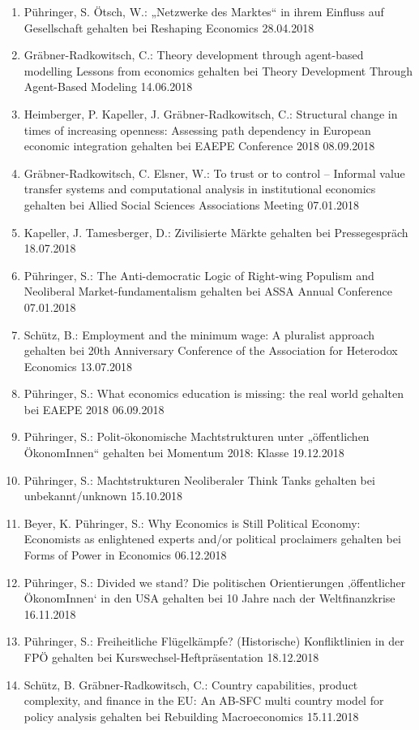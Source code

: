 \begin{enumerate}
	\item Pühringer, S. Ötsch, W.: „Netzwerke des Marktes“ in ihrem Einfluss auf Gesellschaft gehalten bei Reshaping Economics 28.04.2018
	\item Gräbner-Radkowitsch, C.: Theory development through agent-based modelling Lessons from economics gehalten bei Theory Development Through Agent-Based Modeling 14.06.2018
	\item Heimberger, P. Kapeller, J. Gräbner-Radkowitsch, C.: Structural change in times of increasing openness: Assessing path dependency in European economic integration gehalten bei EAEPE Conference 2018 08.09.2018
	\item Gräbner-Radkowitsch, C. Elsner, W.: To trust or to control -- Informal value transfer systems and computational analysis in institutional economics gehalten bei Allied Social Sciences Associations Meeting 07.01.2018
	\item Kapeller, J. Tamesberger, D.: Zivilisierte Märkte gehalten bei Pressegespräch 18.07.2018
	\item Pühringer, S.: The Anti-democratic Logic of Right-wing Populism and Neoliberal Market-fundamentalism gehalten bei ASSA Annual Conference 07.01.2018
	\item Schütz, B.: Employment and the minimum wage: A pluralist approach gehalten bei 20th Anniversary Conference of the Association for Heterodox Economics 13.07.2018
	\item Pühringer, S.: What economics education is missing: the real world gehalten bei EAEPE 2018 06.09.2018
	\item Pühringer, S.: Polit-ökonomische Machtstrukturen unter „öffentlichen ÖkonomInnen“ gehalten bei Momentum 2018: Klasse 19.12.2018
	\item Pühringer, S.: Machtstrukturen Neoliberaler Think Tanks gehalten bei unbekannt/unknown 15.10.2018
	\item Beyer, K. Pühringer, S.: Why Economics is Still Political Economy: Economists as enlightened experts and/or political proclaimers gehalten bei Forms of Power in Economics 06.12.2018
	\item Pühringer, S.: Divided we stand? Die politischen Orientierungen ‚öffentlicher ÖkonomInnen‘ in den USA gehalten bei 10 Jahre nach der Weltfinanzkrise 16.11.2018
	\item Pühringer, S.: Freiheitliche Flügelkämpfe? (Historische) Konfliktlinien in der FPÖ gehalten bei Kurswechsel-Heftpräsentation 18.12.2018
	\item Schütz, B. Gräbner-Radkowitsch, C.: Country capabilities, product complexity, and finance in the EU: An AB-SFC multi country model for policy analysis gehalten bei Rebuilding Macroeconomics 15.11.2018

\end{enumerate}
